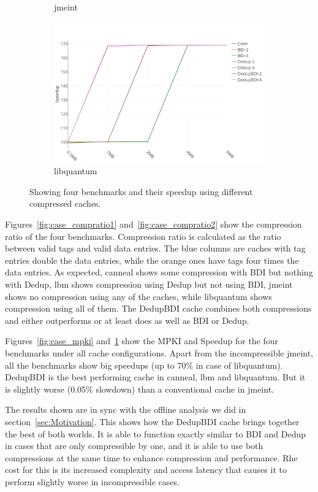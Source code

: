 \begin{figure}
\begin{subfigure}{0.5\textwidth}
        \caption{jmeint}
    \end{subfigure}
    \begin{subfigure}{0.5\textwidth}
        \includegraphics[width=\textwidth]{libquantum-speedup.png}
        \caption{libquantum}
    \end{subfigure}
    \caption[Case Study: Speedup]{Showing four benchmarks and their speedup using different compressed caches.}
    \label{fig:case_speedup}
\end{figure}
Figures~\ref{fig:case_compratio1} and~\ref{fig:case_compratio2} show the compression ratio of the four benchmarks. Compression ratio is calculated as the ratio between valid tags and valid data entries. The blue columns are caches with tag entries double the data entries, while the orange ones have tags four times the data entries. As expected, canneal shows some compression with BDI but nothing with Dedup, lbm shows compression using Dedup but not using BDI, jmeint shows no compression using any of the caches, while libquantum shows compression using all of them. The DedupBDI cache combines both compressions and either outperforms or at least does as well as BDI or Dedup.\par
Figures~\ref{fig:case_mpki} and~\ref{fig:case_speedup} show the MPKI and Speedup for the four benchmarks under all cache configurations. Apart from the incompressible jmeint, all the benchmarks show big speedups (up to 70\% in case of libquantum). DedupBDI is the best performing cache in canneal, lbm and libquantum. But it is slightly worse (0.05\% slowdown) than a conventional cache in jmeint.\par
The results shown are in sync with the offline analysis we did in section~\ref{sec:Motivation}. This shows how the DedupBDI cache brings together the best of both worlds. It is able to function exactly similar to BDI and Dedup in cases that are only compressible by one, and it is able to use both compressions at the same time to enhance compression and performance. Rhe cost for this is its increased complexity and access latency that causes it to perform slightly worse in incompressible cases.


